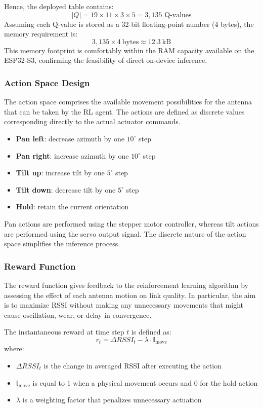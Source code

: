 Hence, the deployed table contains:
\begin{equation}
\left|Q\right| = 19 \times 11 \times 3 \times 5 = 3,135 \text{ Q-values}
\end{equation}
Assuming each Q-value is stored as a 32-bit floating-point number (4 bytes), the
memory requirement is:
\begin{equation}
3,135 \times 4~\text{bytes} \approx 12.3~\text{kB}
\end{equation}
This memory footprint is comfortably within the RAM capacity available on the
ESP32-S3, confirming the feasibility of direct on-device inference.

\subsubsection{Action Space Design}
The action space comprises the available movement possibilities for the antenna
that can be taken by the RL agent. The actions are defined as discrete values
corresponding directly to the actual actuator commands.

\begin{itemize}
    \item \textbf{Pan left}: decrease azimuth by one $10^{\circ}$ step
    \item \textbf{Pan right}: increase azimuth by one $10^{\circ}$ step
    \item \textbf{Tilt up}: increase tilt by one $5^{\circ}$ step
    \item \textbf{Tilt down}: decrease tilt by one $5^{\circ}$ step
    \item \textbf{Hold}: retain the current orientation
\end{itemize}

Pan actions are performed using the stepper motor controller, whereas tilt actions
are performed using the servo output signal. The discrete nature of the action
space simplifies the inference process.

\subsubsection{Reward Function}
The reward function gives feedback to the reinforcement learning algorithm
by assessing the effect of each antenna motion on link quality. In particular,
the aim is to maximize RSSI without making any unnecessary movements that might cause oscillation, wear, or delay in convergence.

The instantaneous reward at time step $t$ is defined as:
\begin{equation}
r_t = \Delta RSSI_t - \lambda \cdot \mathbb{I}_{\text{move}}
\end{equation}
where:
\begin{itemize}
    \item $\Delta RSSI_t$ is the change in averaged RSSI after executing the action
    \item $\mathbb{I}_{\text{move}}$ is equal to $1$ when a physical movement occurs
    and $0$ for the hold action
    \item $\lambda$ is a weighting factor that penalizes unnecessary actuation
\end{itemize}

